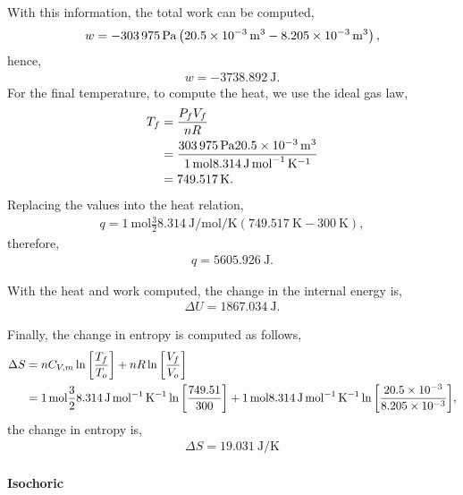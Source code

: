 \documentclass[main.tex]{subfiles}
\begin{document}
With this information, the total work can be computed,
\begin{gather*}
    w = -\SI{303975}{\pascal}\left( \SI{20.5d-3}{\meter\tothe{3}}- \SI{8.205d-3}{\meter\tothe{3}}\right),
\end{gather*}
hence,
\begin{gather*}
    \boxed{w = -\SI{3738.892}{\joule}.}
\end{gather*}
For the final temperature, to compute the heat, we use the ideal gas law,
\begin{align*}
    T_f &= \frac{P_f V_f}{nR} \\
    &= \frac{\SI{303975}{\pascal}\SI{20.5d-3}{\meter\tothe{3}}}{\SI{1}{\mol}\SI{8.314}{\joule\per\mol\per\kelvin}} \\
    &= \SI{749.517}{\kelvin}.
\end{align*}
Replacing the values into the heat relation,
\begin{gather*}
    q = \SI{1}{\mole}\frac{3}{2}\SI{8.314}{\joule\per\mol\per\kelvin}\left(\SI{749.517}{\kelvin}-\SI{300}{\kelvin}\right),
\end{gather*}
therefore,
\begin{gather*}
    \boxed{q = \SI{5605.926}{\joule}.}
\end{gather*}

With the heat and work computed, the change in the internal energy is,
\begin{gather*}
    \Delta U = \SI{1867.034}{\joule}.
\end{gather*}

Finally, the change in entropy is computed as follows,
\begin{align*}
    \Delta S &= nC_{V,m}\ln\qty[\frac{T_f}{T_o}] + nR\ln\qty[\frac{V_f}{V_o}] \\
    &= \SI{1}{\mol}\frac{3}{2}\SI{8.314}{\joule\per\mole\per\kelvin}\ln\qty[\frac{749.51}{300}]+
    \SI{1}{\mol}\SI{8.314}{\joule\per\mole\per\kelvin}\ln\qty[\frac{\num{20.5d-3}}{\num{8.205d-3}}],
\end{align*}
the change in entropy is,
\begin{gather*}
    \boxed{\Delta S = \SI{19.031}{\joule\per\kelvin}}
\end{gather*}

\paragraph{Isochoric}~
\end{document}

